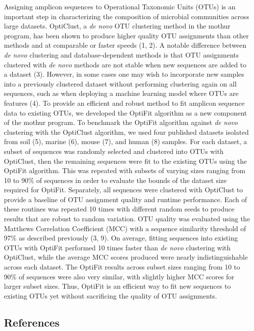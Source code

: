 \documentclass[
  11pt,
]{article}
\begin{document}
Assigning amplicon sequences to Operational Taxonomic Units (OTUs) is an
important step in characterizing the composition of microbial
communities across large datasets. OptiClust, a \emph{de novo} OTU
clustering method in the mothur program, has been shown to produce
higher quality OTU assignments than other methods and at comparable or
faster speeds (1, 2). A notable difference between \emph{de novo}
clustering and database-dependent methods is that OTU assignments
clustered with \emph{de novo} methods are not stable when new sequences
are added to a dataset (3). However, in some cases one may wish to
incorporate new samples into a previously clustered dataset without
performing clustering again on all sequences, such as when deploying a
machine learning model where OTUs are features (4). To provide an
efficient and robust method to fit amplicon sequence data to existing
OTUs, we developed the OptiFit algorithm as a new component of the
mothur program. To benchmark the OptiFit algorithm against \emph{de
novo} clustering with the OptiClust algorithm, we used four published
datasets isolated from soil (5), marine (6), mouse (7), and human (8)
samples. For each dataset, a subset of sequences was randomly selected
and clustered into OTUs with OptiClust, then the remaining sequences
were fit to the existing OTUs using the OptiFit algorithm. This was
repeated with subsets of varying sizes ranging from 10 to 90\% of
sequences in order to evaluate the bounds of the dataset size required
for OptiFit. Separately, all sequences were clustered with OptiClust to
provide a baseline of OTU assignment quality and runtime performance.
Each of these routines was repeated 10 times with different random seeds
to produce results that are robust to random variation. OTU quality was
evaluated using the Matthews Correlation Coefficient (MCC) with a
sequence similarity threshold of 97\% as described previously (3, 9). On
average, fitting sequences into existing OTUs with OptiFit performed 10
times faster than \emph{de novo} clustering with OptiClust, while the
average MCC scores produced were nearly indistinguishable across each
dataset. The OptiFit results across subset sizes ranging from 10 to 90\%
of sequences were also very similar, with slightly higher MCC scores for
larger subset sizes. Thus, OptiFit is an efficient way to fit new
sequences to existing OTUs yet without sacrificing the quality of OTU
assignments.

\hypertarget{references}{%
\subsection*{References}\label{references}}
\end{document}

